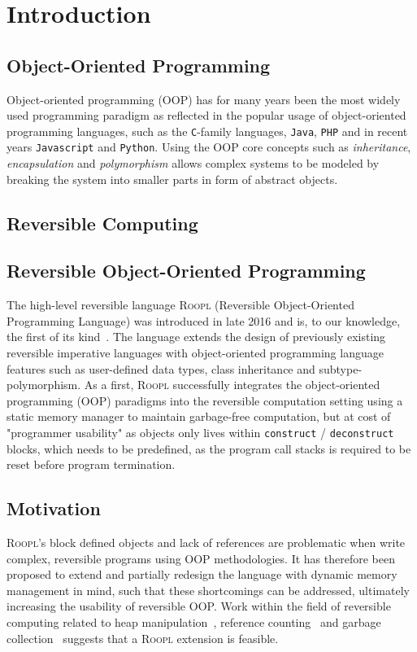 \chapter{Introduction}
\label{chp:introduction}

\section{Object-Oriented Programming}
\label{sec:object-oriented-programming}
Object-oriented programming (OOP) has for many years been the most widely used programming paradigm as reflected in the popular usage of object-oriented programming languages, such as the \texttt{C}-family languages, \texttt{Java}, \texttt{PHP} and in recent years \texttt{Javascript} and \texttt{Python}. Using the OOP core concepts such as \textit{inheritance}, \textit{encapsulation} and \textit{polymorphism} allows complex systems to be modeled by breaking the system into smaller parts in form of abstract objects. 

\section{Reversible Computing}
\label{sec:reversible-computing}

\section{Reversible Object-Oriented Programming}
\label{sec:reversible-object-oriented-programming}
The high-level reversible language \textsc{Roopl} (Reversible Object-Oriented Programming Language) was introduced in late 2016 and is, to our knowledge, the first of its kind~\cite{th:roopl}. The language extends the design of previously existing reversible imperative languages with object-oriented programming language features such as user-defined data types, class inheritance and subtype-polymorphism. As a first, \textsc{Roopl} successfully integrates the object-oriented programming (OOP) paradigms into the reversible computation setting using a static memory manager to maintain garbage-free computation, but at cost of "programmer usability" as objects only lives within \texttt{construct} / \texttt{deconstruct} blocks, which needs to be predefined, as the program call stacks is required to be reset before program termination.

\section{Motivation}
\label{sec:motivation}
\textsc{Roopl}'s block defined objects and lack of references are problematic when write complex, reversible programs using OOP methodologies. It has therefore been proposed to extend and partially redesign the language with dynamic memory management in mind, such that these shortcomings can be addressed, ultimately increasing the usability of reversible OOP. Work within the field of reversible computing related to heap manipulation~\cite{ha:heap}, reference counting~\cite{tm:refcounting} and garbage collection~\cite{tm:garbage} suggests that a \textsc{Roopl} extension is feasible.



